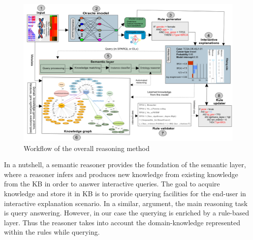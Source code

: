 \begin{figure}
	\centering
	\includegraphics[scale=0.9]{images/reasoning_wf.png}
	\caption{Workflow of the overall reasoning method} 
	\label{fig:reasoning_wf}
	\vspace{-2mm}
\end{figure} 

\hspace*{3.5mm} In a nutshell, a semantic reasoner provides the foundation of the semantic layer, where a reasoner infers and produces new knowledge from existing knowledge from the KB in order to answer interactive queries. 
The goal to acquire knowledge and store it in KB is to provide querying facilities for the end-user in interactive explanation scenario. In a similar, argument, the main reasoning task is query answering. However, in our case the querying is enriched by a rule-based layer. Thus the reasoner takes into account the domain-knowledge represented within the rules while querying. 

